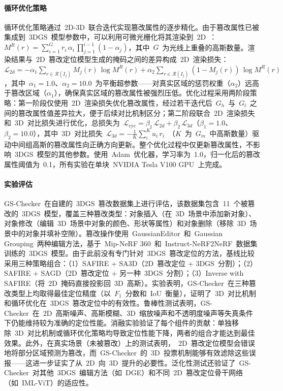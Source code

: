 \paragraph{循环优化策略} 循环优化策略通过~2D-3D~联合迭代实现篡改属性的逐步精化。由于篡改属性已被集成到~3DGS~模型参数中，可以利用可微光栅化将其渲染到~2D~：$M^R(r) = \sum_{i=1}^{G} r_i\,\alpha_i\,\prod_{j=1}^{i-1}(1-\alpha_j)$，其中~$G$~为光线上重叠的高斯数量。渲染结果与~2D~篡改定位模型生成的掩码之间的差异构成~2D~渲染损失：$\mathcal{L}_{2d} = -\alpha_1 \sum_{r \in \mathcal{R}(I_j)} M_j(r)\,\log M^R(r) + \alpha_2 \sum_{r \in \mathcal{R}(I_j)} (1-M_j(r))\,\log M^R(r)$，其中~$\alpha_1 = 1.0$、$\alpha_2 = 10.0$~为平衡超参数——对真实区域的惩罚权重（$\alpha_2$）远高于篡改区域（$\alpha_1$），确保真实区域的篡改属性被强烈压低。优化过程采用两阶段策略：第一阶段仅使用~2D~渲染损失优化篡改属性，经过若干迭代后~$G_h$~与~$G_l$~之间的篡改属性值差异拉大，便于后续对比机制区分；第二阶段联合~2D~渲染损失和~3D~对比损失进行优化，总损失为~$\mathcal{L}_{\mathrm{cyc}} = \beta_1\,\mathcal{L}_{2d} + \beta_2\,\mathcal{L}_{3d}$（$\beta_1 = 1.0$、$\beta_2 = 10.0$），其中~3D~对比损失~$\mathcal{L}_{3d} = -\frac{1}{K}\sum_{i}^{K} u_i\,r_i$~（$K$~为~$G_m$~中高斯数量）驱动中间组高斯的篡改属性向正确方向更新。整个优化过程中仅更新篡改属性，不影响~3DGS~模型的其他参数。使用~Adam~优化器，学习率为~1.0，归一化后的篡改属性阈值为~0.1，所有实验在单块~NVIDIA Tesla V100 GPU~上完成。

\paragraph{实验评估} GS-Checker~在自建的~3DGS~篡改数据集上进行评估，该数据集包含~11~个被篡改的~3DGS~模型，覆盖三种篡改类型：对象插入（在~3D~场景中添加新对象）、对象修改（编辑~3D~场景中对象的颜色、形状等属性）和对象删除（移除~3D~场景中的对象并填补空隙）。篡改操作使用~GaussianEditor~和~Gaussian Grouping~两种编辑方法，基于~Mip-NeRF 360~和~Instruct-NeRF2NeRF~数据集训练的~3DGS~模型。由于此前没有专门针对~3DGS~篡改定位的方法，基线比较采用三种策略组合：（1）SAFIRE + SA3D（2D~篡改定位 + 3DGS~分割）；（2）SAFIRE + SAGD（2D~篡改定位 + 另一种~3DGS~分割）；（3）Inverse with SAFIRE（将~2D~掩码直接投影回~3D~高斯）。实验表明，GS-Checker~在三种篡改类型上均取得最佳定位精度（以~$F_1$~分数和~IoU~衡量），证明了~3D~对比机制和循环优化在~3DGS~篡改定位中的有效性。鲁棒性测试表明，GS-Checker~在~2D~高斯噪声、高斯模糊、3D~缩放噪声和不透明度噪声等失真条件下仍能维持较为准确的定位性能。消融实验验证了每个组件的贡献：单独移除~3D~对比机制或循环优化策略均导致定位性能下降，两者的组合才能达到最佳效果。此外，在真实场景（未被篡改）上的测试表明，~2D~篡改定位模型会错误地将部分区域预测为篡改，而~GS-Checker~的~3D~投票机制能够有效滤除这些误报——这进一步证实了从~2D~向~3D~提升的必要性。泛化性测试还验证了~GS-Checker~对其他~3DGS~编辑方法（如~DGE）和不同~2D~篡改定位骨干网络（如~IML-ViT）的适应性。

